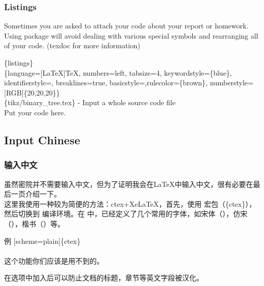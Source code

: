 \begin{frame}
	\frametitle{Listings}
	Sometimes you are asked to attach your code about your report or homework. Using  package will avoid dealing with various special symbols and rearranging all of your code. (\alert{texdoc}  for more information)
	\begin{example}
		\{listings\}\\
		\{language=[LaTeX]TeX, numbers=left, tabsize=4, keywordstyle=\{blue\}, identifierstyle=, breaklines=true, basicstyle=,rulecolor=\{brown\}, numberstyle=[RGB]\{20,20,20\}\}\\
		\{tikz/binary\_tree.tex\} - Input a whole source code file
		\\
		Put your code here.\\
	\end{example} 
\end{frame}

\subsection{Input Chinese}

\begin{frame}
	\songti
	\frametitle{输入中文}
	\qquad 虽然密院并不需要输入中文，但为了证明我会在\LaTeX 中输入中文，很有必要在最后一页介绍一下。\\
	\qquad 这里我使用一种较为简便的方法：ctex+XeLaTeX，首先，使用  宏包（\{ctex\}），然后切换到  编译环境。在  中，已经定义了几个常用的字体，如宋体（），仿宋（），楷书（）等。
	\begin{exampleblock}{例}
		[scheme=plain]\{ctex\}\\
		\\
		这个功能你们应该是用不到的。
	\end{exampleblock}
	\qquad 在选项中加入\structure{[scheme=plain]}后可以防止文档的标题，章节等英文字段被汉化。
\end{frame}
